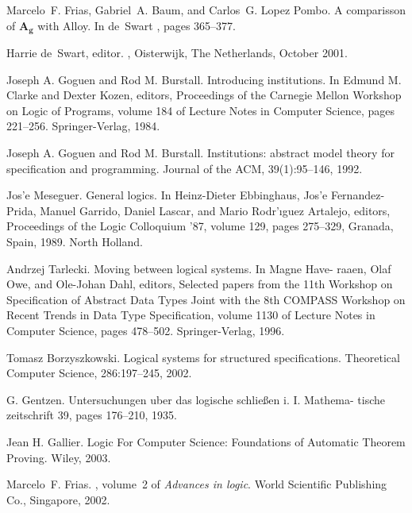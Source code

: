 \begin{thebibliography}{tesis}
Marcelo~{F.} Frias, Gabriel~{A.} Baum, and Carlos~{G.} {Lopez Pombo}.
\newblock A comparisson of $\mathbf{A_g}$ with {Alloy}.
\newblock In de~Swart \cite{relmics01}, pages 365--377.

Harrie de~Swart, editor.
, Oisterwijk, The Netherlands, October 2001.
  
	Joseph A. Goguen and Rod M. Burstall. Introducing institutions. In Edmund M. Clarke and Dexter Kozen, editors, Proceedings of the Carnegie Mellon Workshop on Logic of Programs, volume 184 of Lecture Notes in Computer Science, pages 221–256. Springer-Verlag, 1984.

  Joseph A. Goguen and Rod M. Burstall. Institutions: abstract model theory for specification and programming. Journal of the ACM, 39(1):95–146, 1992.

	Jos'e Meseguer. General logics. In Heinz-Dieter Ebbinghaus, Jos'e Fernandez-Prida, Manuel Garrido, Daniel Lascar, and Mario Rodr'ıguez Artalejo, editors, Proceedings of the Logic Colloquium ’87, volume 129, pages 275–329, Granada, Spain, 1989. North Holland.

	Andrzej Tarlecki. Moving between logical systems. In Magne Have- raaen, Olaf Owe, and Ole-Johan Dahl, editors, Selected papers from the 11th Workshop on Specification of Abstract Data Types Joint with the 8th COMPASS Workshop on Recent Trends in Data Type Specification, volume 1130 of Lecture Notes in Computer Science, pages 478–502. Springer-Verlag, 1996.

	Tomasz Borzyszkowski. Logical systems for structured specifications. Theoretical Computer Science, 286:197–245, 2002.

	G. Gentzen. Untersuchungen uber das logische schließen i. I. Mathema- tische zeitschrift 39, pages 176–210, 1935.
	
	Jean H. Gallier. Logic For Computer Science: Foundations of Automatic Theorem Proving. Wiley, 2003.

Marcelo~{F.} Frias.
, volume~2
  of {\em Advances in logic}.
\newblock World Scientific Publishing Co., Singapore, 2002.

\end{thebibliography}

